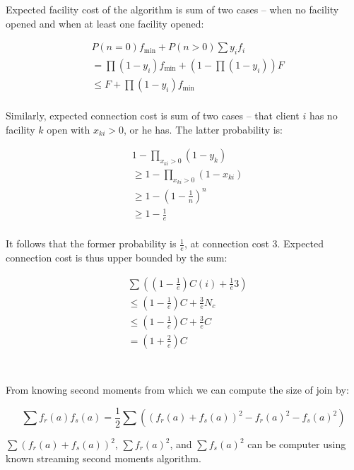 \documentclass[a4paper,11pt,oneside,onecolumn]{article}
\begin{document}
Expected facility cost of the algorithm is sum of two cases -- when no facility opened and when at least one facility opened:

\begin{align*}
& P(n=0) f_{\min} + P(n>0)\sum y_i f_i \\
& = \prod(1 - y_i) f_{\min} + \left(1 - \prod(1 - y_i)\right) F \\
& \le F + \prod(1 - y_i) f_{\min} \\
\end{align*}

Similarly, expected connection cost is sum of two cases -- that client $i$ has no facility $k$ open with $x_{ki} > 0$, or he has. The latter
probability is:

\begin{align*}
& 1 - \prod_{x_{ki} > 0} (1 - y_k) \\
& \ge 1 - \prod_{x_{ki} > 0} (1 - x_{ki}) \\
& \ge 1 - \left( 1 - \frac{1}{n} \right)^n \\
& \ge 1 - \frac{1}{e} \\
\end{align*}

It follows that the former probability is $\frac{1}{e}$, at connection cost $3$. Expected connection cost is thus upper bounded by the sum:

\begin{align*}
& \sum \left( \left( 1 - \frac{1}{e} \right) C(i) + \frac{1}{e} 3 \right) \\
& \le \left( 1 - \frac{1}{e} \right) C + \frac{3}{e} N_c \\
& \le \left( 1 - \frac{1}{e} \right) C + \frac{3}{e} C \\
& = \left( 1 + \frac{2}{e} \right) C \\
\end{align*}

\section{}

From knowing second moments from which we can compute the size of join by:

$$
\sum f_r(a)f_s(a) = \frac{1}{2} \sum \left( (f_r(a) + f_s(a))^2 - f_r(a)^2 - f_s(a)^2 \right)
$$

$\sum (f_r(a) + f_s(a))^2$, $\sum f_r(a)^2$, and $\sum f_s(a)^2$ can be computer using known streaming second moments algorithm.
\end{document}
